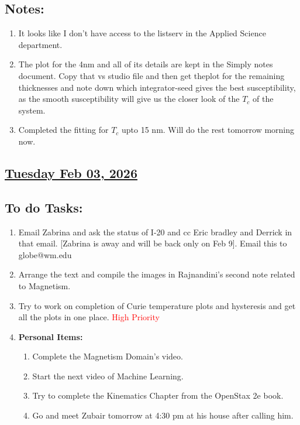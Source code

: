 \subsection*{Notes:}
\begin{enumerate}
    \item It looks like I don't have access to the listserv in the Applied Science department.
    \item The plot for the 4nm and all of its details are kept in the Simply notes document. Copy that vs studio file and then get theplot for the remaining thicknesses and note down which integrator-seed gives the best susceptibility, as the smooth susceptibility will give us the closer look of the $T_c$ of the system. 
    \item Completed the fitting for $T_c$ upto 15 nm. Will do the rest tomorrow morning now. 
\end{enumerate}
\subsection*{\underline{Tuesday Feb 03, 2026}}
\subsection*{To do Tasks:}
\begin{enumerate}
    \item Email Zabrina and ask the status of I-20 and cc Eric bradley and Derrick in that email. [Zabrina is away and will be back only on Feb 9]. Email this to globe@wm.edu \cmark    
    \item Arrange the text and compile the images in Rajnandini's second note related to Magnetism.\xmark
    \item Try to work on completion of Curie temperature plots and hysteresis and get all the plots in one place. \textcolor{red}{High Priority} \cmark
    \item \textbf{Personal Items:}
    \begin{enumerate}
        \item Complete the Magnetism Domain's video.\xmark
        \item Start the next video of Machine Learning.\xmark
        \item Try to complete the Kinematics Chapter from the OpenStax 2e book.\xmark
        \item Go and meet Zubair tomorrow at 4:30 pm at his house after calling him.\cmark
    \end{enumerate} 
\end{enumerate}
